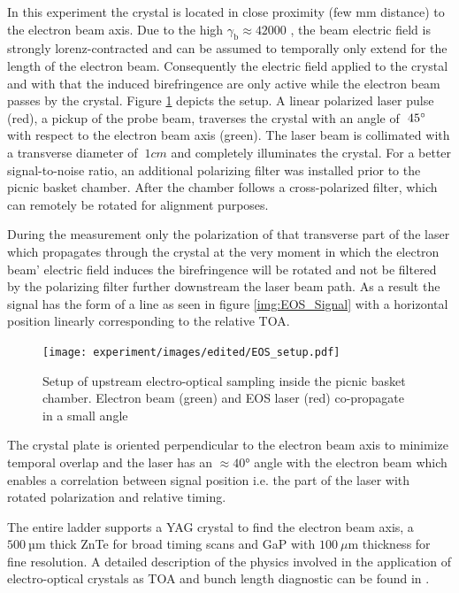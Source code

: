 In this experiment the crystal is located in close proximity (few mm distance) to the electron beam axis. Due to the high $\gamma_\mathrm{b} \approx 42000$ , the beam electric field is strongly lorenz-contracted and can be assumed to temporally only extend for the length of the electron beam. Consequently the electric field applied to the crystal and with that the induced birefringence are only active while the electron beam passes by the crystal.  
Figure \ref{img:EOS_Setup} depicts the setup.
A linear polarized laser pulse (red), a pickup of the probe beam, traverses the crystal with an angle of $~ 45\degree$ with respect to the electron beam axis (green). The laser beam is collimated with a transverse diameter of $~ 1 cm $ and completely illuminates the crystal. For a better signal-to-noise ratio, an additional polarizing filter was installed prior to the picnic basket chamber. After the chamber follows a cross-polarized filter, which can remotely be rotated for alignment purposes.

During the measurement only the polarization of that transverse part of the laser which propagates through the crystal at the very moment in which the electron beam' electric field induces the birefringence will be rotated and not be filtered by the polarizing filter further  downstream the laser beam path. As a result the signal has the form of a line as seen in figure \ref{img:EOS_Signal} with a horizontal position linearly corresponding to the relative TOA.

\begin{figure}[htbp]
\center
\texttt{[image: experiment/images/edited/EOS\_setup.pdf]}
\caption{Setup of upstream electro-optical sampling inside the picnic basket chamber. Electron beam (green) and EOS laser (red) co-propagate in a small angle }
\label{img:EOS_Setup}
\end{figure}

The crystal plate is oriented perpendicular to the electron beam axis to minimize temporal overlap and the laser has an $\approx 40°$ angle with the electron beam which enables a correlation between signal position i.e. the part of the laser with rotated polarization and relative timing.

The entire ladder supports a YAG crystal to find the electron beam axis, a $500\ \mathrm{µm}$ thick ZnTe for broad timing scans and GaP with $100\ \mu\mathrm{m}$ thickness for fine resolution.
A detailed description of the physics involved in the application of electro-optical crystals as TOA and bunch length diagnostic can be found in \cite{BerndSteffenPhD}.


